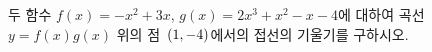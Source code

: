 두 함수 $f(x)=-x^2+3x$, $g(x)=2x^3+x^2-x-4$에 대하여 곡선 $y=f(x)g(x)$ 위의 점~$(1{,}\mkern3mu\mathopen{}-4)$에서의 접선의 기울기를 구하시오.
